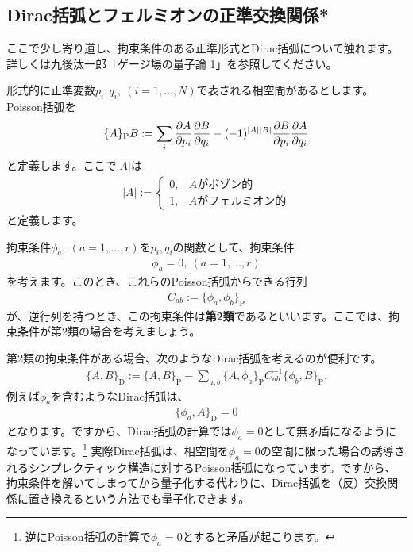 \documentclass[report,paper=a4, fontsize=12pt, line_length=16cm, number_of_lines=33,dvipdfmx]{jlreq}
\numberwithin{equation}{chapter}
\numberwithin{equation}{section}
\newcommand{\kyou}[1]{{\sffamily \bfseries #1}}
\newcommand{\pbk}[1]{\{#1\}_{\mathrm{P}}}
\newcommand{\dbk}[1]{\{#1\}_{\mathrm{D}}}
\begin{document}
\subsection{Dirac括弧とフェルミオンの正準交換関係*}
ここで少し寄り道し、拘束条件のある正準形式とDirac括弧について触れます。詳しくは九後汰一郎「ゲージ場の量子論 1」を参照してください。

形式的に正準変数$p_i,q_i,\ (i=1,\dots,N)$で表される相空間があるとします。Poisson括弧を
\begin{align}
  \pbk{A}{B}:=\sum_{i}\pdv{A}{p_i}\pdv{B}{q_i}-(-1)^{|A||B|}\pdv{B}{p_i}\pdv{A}{q_i}
\end{align}
と定義します。ここで$|A|$は
\begin{align}
  |A|:=\begin{cases}
    0,&A\text{がボゾン的}\\
    1,&A\text{がフェルミオン的}
  \end{cases}
\end{align}
と定義します。

拘束条件$\phi_{a},\ (a=1,\dots,r)$を$p_i,q_i$の関数として、拘束条件
\begin{align}
  \phi_{a}=0,\ (a=1,\dots,r)
\end{align}
を考えます。このとき、これらのPoisson括弧からできる行列
\begin{align}
  C_{ab}:=\pbk{\phi_a,\phi_b}
\end{align}
が、逆行列を持つとき、この拘束条件は\kyou{第2類}であるといいます。ここでは、拘束条件が第2類の場合を考えましょう。

第2類の拘束条件がある場合、次のようなDirac括弧を考えるのが便利です。
\begin{align}
  \dbk{A,B}:=\pbk{A,B}-\sum_{a,b} \pbk{A,\phi_a} C^{-1}_{ab} \pbk{\phi_b,B}.
\end{align}
例えば$\phi_a$を含むようなDirac括弧は、
\begin{align}
  \dbk{\phi_a,A}=0
\end{align}
となります。ですから、Dirac括弧の計算では$\phi_a=0$として無矛盾になるようになっています。\footnote{逆にPoisson括弧の計算で$\phi_a=0$とすると矛盾が起こります。}
実際Dirac括弧は、相空間を$\phi_a=0$の空間に限った場合の誘導されるシンプレクティック構造に対するPoisson括弧になっています。ですから、拘束条件を解いてしまってから量子化する代わりに、Dirac括弧を（反）交換関係に置き換えるという方法でも量子化できます。
\end{document}

